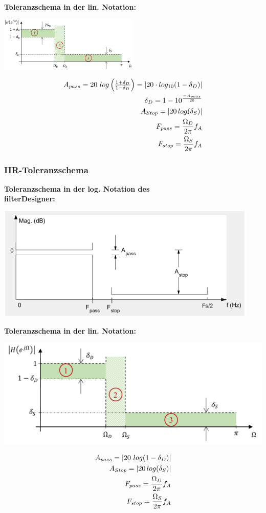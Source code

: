 \documentclass[10pt,a4paper]{article}
\begin{document}
\textbf{Toleranzschema in der lin. Notation: }
  \begin{center}
    \includegraphics[width=0.5\textwidth]{./img/toleranzschema.png}
  \end{center}
  \begin{mdframed}[style=exercise]
    \begin{align}
      A_{pass}=20~log\left(\textstyle{\frac{1+\delta_{D}}{1-\delta_{D}}}\right)=\abs{20\cdot log_{10}(1-\delta_{D})}\\
      \delta_{D}= 1- 10^{\frac{-A_{pass}}{20}}\\
      A_{Stop}=\abs{20\,log(\delta_{S})}\\
      F_{pass}=\frac{\Omega_{D}}{2\pi}f_{A}\\
      F_{stop}=\frac{\Omega_{S}}{2\pi}f_{A}\\
    \end{align}
  \end{mdframed}

\subsubsection{IIR-Toleranzschema}
\textbf{Toleranzschema in der log. Notation des \\ \grqq{}filterDesigner\grqq{}: }
\begin{center}
    \includegraphics[width=.5\textwidth]{./img/iirtyp2.png}
  \end{center}

\textbf{Toleranzschema in der lin. Notation: }
\begin{center}
    \includegraphics[width=.5\textwidth]{./img/iirtyp1.png}
\end{center}
\begin{mdframed}[style=exercise]
  \begin{align}
  A_{pass}=\abs{ 20~log(1-\delta_{D}) }\\
  A_{Stop}=\abs{20\,log(\delta_{S})}\\
  F_{pass}=\frac{\Omega_{D}}{2\pi}f_{A}\\
  F_{stop}=\frac{\Omega_{S}}{2\pi}f_{A}
  \end{align}
\end{mdframed}
\end{document}
